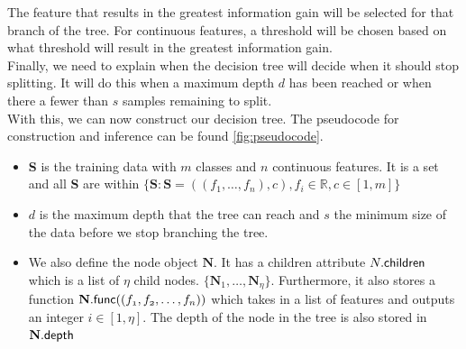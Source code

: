 The feature that results in the greatest information gain will be selected for that branch of the tree. For continuous features, a threshold will be chosen based on what threshold will result in the greatest information gain. \\

Finally, we need to explain when the decision tree will decide when it should stop splitting. It will do this when a maximum depth $d$ has been reached or when there a fewer than $s$ samples remaining to split. \\

 With this, we can now construct our decision tree. The pseudocode for construction and inference can be found \ref{fig:pseudocode}.
\begin{itemize}
	\item \textbf{S} is the training data with $m$ classes and $n$ continuous features. It is a set and all \textbf{S} are within $\{\textbf{S} : \textbf{S} = {((f_1,\dots,f_n),c),f_i\in\mathbb{R},c\in [1,m]}\}$
	\item $d$ is the maximum depth that the tree can reach and $s$ the minimum size of the data before we stop branching the tree.
	\item We also define the node object $\textbf{N}$. It has a children attribute $N.\sf{children}$ which is a list of $\eta$ child nodes. $\{\textbf{N}_1,\dots,\textbf{N}_\eta\}$. Furthermore, it also stores a function $\textbf{N}.\sf{func}(\mathnormal{(f_1,f_2,\dots,f_n)})$ which takes in a list of features and outputs an integer $i\in[1,\eta]$. The depth of the node in the tree is also stored in $\textbf{N}.\sf{depth}$
\end{itemize}

